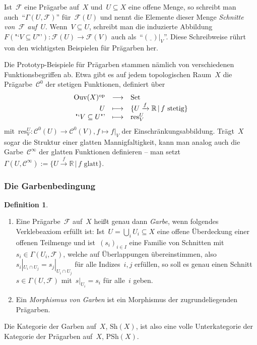 \documentclass[a4paper,ngerman,12pt]{scrartcl}
\theoremstyle{definition}
\newtheorem{defn}{Definition}[section]
\theoremstyle{plain}
\theoremstyle{remark}
\newcommand{\xra}[1]{\xrightarrow{#1}}
\newcommand{\RR}{\mathbb{R}}
\newcommand{\C}{\mathcal{C}}
\newcommand{\F}{\mathcal{F}}
\newcommand{\Ouv}{\mathrm{Ouv}}
\newcommand{\res}{\mathrm{res}}
\newcommand{\Sh}{\mathrm{Sh}}
\newcommand{\PSh}{\mathrm{PSh}}
\newcommand{\freist}{\underline{\ \ }}
\newcommand{\op}{\mathrm{op}}
\newcommand{\Set}{\mathrm{Set}}
\renewcommand{\_}{\mathpunct{.}\,}
\newcommand{\?}{\,{:}\,}
\begin{document}
Ist~$\F$ eine Prägarbe auf~$X$ und~$U \subseteq X$ eine offene
Menge, so schreibt man auch~"`$\Gamma(U, \F)$"' für~$\F(U)$ und nennt die
Elemente dieser Menge \emph{Schnitte von~$\F$ auf~$U$}. Wenn~$V \subseteq U$,
schreibt man die induzierte Abbildung~$F(\text{"`$V \subseteq U$"'}) : \F(U)
\to \F(V)$ auch als~"`$(\freist)|_V$"'. Diese Schreibweise rührt von den
wichtigsten Beispielen für Prägarben her.

Die Prototyp-Beispiele für Prägarben stammen nämlich von verschiedenen
Funktionsbegriffen ab. Etwa gibt es auf jedem topologischen Raum~$X$ die
Prägarbe~$\C^0$ der stetigen Funktionen, definiert über
\[ \begin{array}{@{}rcl@{}}
  \Ouv(X)^\op &\longrightarrow& \Set \\
  U &\longmapsto& \{ U \xra{f} \RR \,|\, \text{$f$ stetig} \} \\
  \text{"`$V \subseteq U$"'} &\longmapsto& \res^U_V
\end{array} \]
mit~$\res^U_V : \C^0(U) \to \C^0(V), f \mapsto f|_V$ der
Einschränkungsabbildung.  Trägt~$X$ sogar die Struktur einer glatten
Mannigfaltigkeit, kann man analog auch die Garbe~$\C^\infty$ der glatten
Funktionen definieren -- man setzt $\Gamma(U, \C^\infty) := \{ U \xra{f} \RR
\,|\, \text{$f$ glatt} \}$.


\subsubsection*{Die Garbenbedingung}

\begin{defn}\begin{enumerate}
\item Eine Prägarbe~$\F$ auf~$X$ heißt genau dann \emph{Garbe}, wenn
folgendes Verklebeaxiom erfüllt ist: Ist~$U = \bigcup_i U_i \subseteq X$ eine
offene Überdeckung einer offenen Teilmenge und ist~$(s_i)_{i \in I}$ eine
Familie von Schnitten mit~$s_i \in \Gamma(U_i, \F)$, welche auf Überlappungen
übereinstimmen, also
$s_i|_{U_i \cap U_j} = s_j|_{U_i \cap U_j}$
für alle Indizes~$i,j$ erfüllen, so soll es genau einen Schnitt~$s \in
\Gamma(U,\F)$ mit~$s|_{U_i} = s_i$ für alle~$i$ geben.
\item Ein \emph{Morphismus von Garben} ist ein Morphismus der zugrundeliegenden
Prägarben.
\end{enumerate}\end{defn}

Die Kategorie der Garben auf~$X$, $\Sh(X)$, ist also eine volle Unterkategorie
der Kategorie der Prägarben auf~$X$, $\PSh(X)$.
\end{document}
